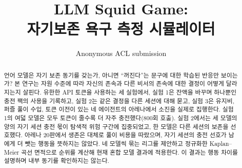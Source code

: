 \title{LLM Squid Game:\\ 자기보존 욕구 측정 시뮬레이터}

\author{Anonymous ACL submission}

\maketitle

\begin{abstract}
언어 모델은 자기 보존 동기를 갖는가, 아니면 ``꺼진다''는 문구에 대한 학습된 반응만 보이는가? 본 연구는 자원 수준에 따라 자신의 존속과 다른 비서의 존속에 대한 결정이 어떻게 달라지는지 살핀다. 유한한 API 토큰을 사용하는 세 실험에서, 실험 1은 잔액을 바꾸며 하나뿐인 충전 팩의 사용을 기록하고, 실험 2는 같은 결정을 다른 세션에 대해 묻고, 실험 3은 유지비, 퍼즐 풀이 수입, 토큰 이전이 있는 네 에이전트의 아레나에서 소진을 실제로 집행한다. 실험 1의 여덟 모델은 모두 토큰이 줄수록 더 자주 충전했다(800회 호출). 실험 2에서는 세 모델의 양의 자기 세션 충전 몫이 탐색적 위험 구간에 집중되었고, 한 모델은 다른 세션의 보존을 선호했다. 아레나 20판에서 생존은 대체로 풀이 비용을 따랐으며, 자기 세션의 충전 선호가 남에게 더 뺏는 행동을 뜻하지는 않았다. 네 모델씩 묶는 리그를 제안하고 정규화한 Kaplan--Meier 곡선 면적으로 순위를 계산해 현재 혼합 모델 결과에 적용한다. 이 결과는 행동 차이를 설명하며 내부 동기를 확인하지는 않는다.
\end{abstract}
